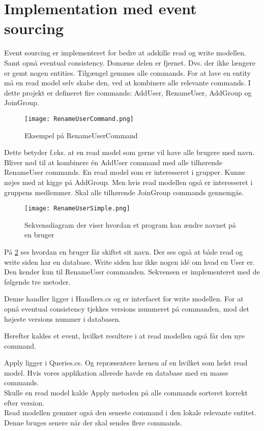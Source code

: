 \section{Implementation med event sourcing}
Event sourcing er implementeret for bedre at adskille read og write modellen. Samt opnå eventual consistency.
Domæne delen er fjernet. Dvs. der ikke længere er gemt nogen entities. Tilgængel gemmes alle commands.
For at lave en entity må en read model selv skabe den, ved at kombinere alle relevante commands.
I dette projekt er defineret fire commands: AddUser, RenameUser, AddGroup og JoinGroup.
\begin{figure}[H]
	\center
	\texttt{[image: RenameUserCommand.png]}
	\caption{Eksempel på RenameUserCommand}
	\label{fig:RenameUserCommandl}
\end{figure}
Dette betyder f.eks. at en read model som gerne vil have alle brugere med navn. Bliver nød til at kombinere én AddUser command med alle tilhørende RenameUser commands.
En read model som er interesseret i grupper. Kunne nøjes med at kigge på AddGroup. Men hvis read modellen også er interesseret i gruppens medlemmer. Skal alle tilhørende JoinGroup commands gennemgås.
\begin{figure}[H]
	\center
	\texttt{[image: RenameUserSimple.png]}
	\caption{Sekvensdiagram der viser hvordan et program kan ændre navnet på en bruger}
	\label{fig:RenameUserSequence}
\end{figure}
På \ref{fig:RenameUserSequence} ses hvordan en bruger får skiftet sit navn. Der ses også at både read og write siden har en database.
Write siden har ikke nogen idé om hvad en User er. Den kender kun til RenameUser commanden.
Sekvensen er implementeret med de følgende tre metoder. 

Denne handler ligger i Handlers.cs og er interfacet for write modellen. 
For at opnå eventual consistency tjekkes versions nummeret på commanden, mod det højeste versions nummer i databasen.

Herefter kaldes et event, hvilket resultere i at read modellen også får den nye command.

Apply ligger i Queries.cs. Og repræsentere kernen af en hvilket som helst read model.
Hvis vores applikation allerede havde en database med en masse commands. \\
Skulle en read model kalde Apply metoden på alle commands sorteret korrekt efter version. \\
Read modellen gemmer også den seneste command i den lokale relevante entitet. Denne bruges senere når der skal sendes flere commands. \\
